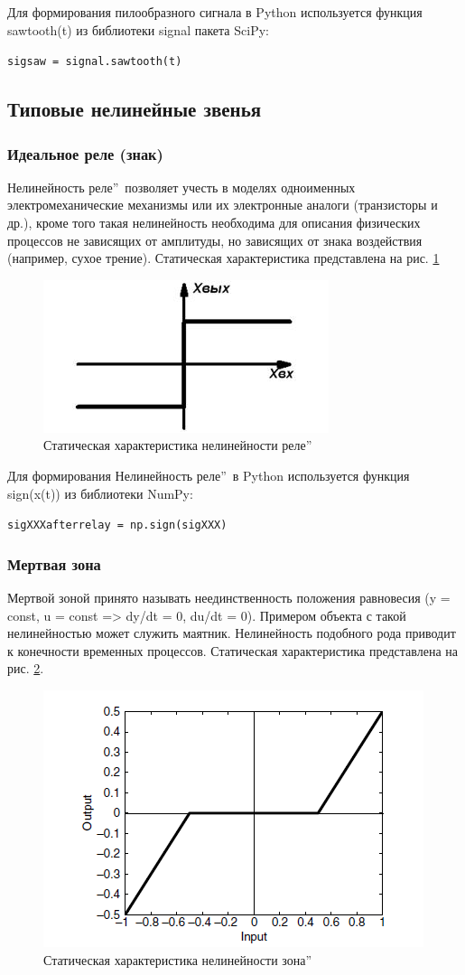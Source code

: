 Для формирования пилообразного сигнала в Python используется функция sawtooth(t) из библиотеки signal пакета SciPy:

\texttt{sig\textunderscore saw = signal.sawtooth(t)}
\subsection{Типовые нелинейные звенья}
\subsubsection{Идеальное реле (знак)}
Нелинейность  реле\textquotedblright\ позволяет учесть в моделях одноименных электромеханические механизмы
или их электронные аналоги (транзисторы и др.), кроме того такая нелинейность необходима
для описания физических процессов не зависящих от амплитуды, но зависящих от знака
воздействия (например, сухое трение). Статическая характеристика представлена на рис. \ref{fig:4}
\begin{figure}[H]
	\centering
	\includegraphics[width=0.5\linewidth]{body/templates/relay.png}
	\caption{Статическая характеристика нелинейности  реле\textquotedblright}
	\label{fig:4}
\end{figure}

Для формирования Нелинейность  реле\textquotedblright\ в Python используется функция sign(x(t)) из библиотеки NumPy:

\texttt{sig\textunderscore XXX\textunderscore after\textunderscore relay = np.sign(sig\textunderscore XXX)}
\subsubsection{Мертвая зона}
Мертвой зоной принято называть неединственность положения равновесия
(y = const, u = const => dy/dt = 0, du/dt = 0). Примером объекта с такой нелинейностью может
служить маятник. Нелинейность подобного рода приводит к конечности временных процессов.
Статическая характеристика представлена на рис. \ref{fig:5}.
\begin{figure}[H]
	\centering
	\includegraphics[width=0.5\linewidth]{body/templates/dead-zone.png}
	\caption{Статическая характеристика нелинейности  зона\textquotedblright}
	\label{fig:5}
\end{figure}

